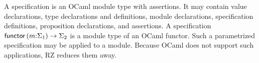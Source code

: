 A specification is an OCaml module type with assertions. It may
contain value declarations, type declarations and definitions, module
declarations, specification definitions, proposition declarations, and
assertions. A specification $\mathsf{functor}\, (m{:}\Sigma_1) \to \Sigma_2$ is a
module type of an OCaml functor. Such a parametrized specification may
be applied to a module. Because OCaml does not support such
applications, RZ reduces them away.


